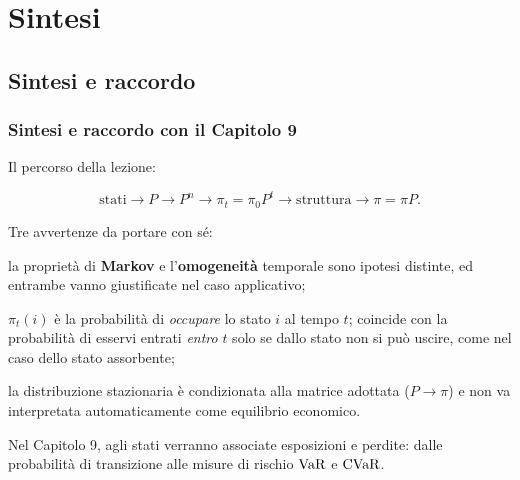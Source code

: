 

\section{Sintesi}

\subsection{Sintesi e raccordo}%

\begin{frame}%
%

\frametitle{Sintesi e raccordo con il Capitolo 9}%
%

%


Il percorso della lezione:%

\[
\text{stati} \longrightarrow P \longrightarrow P^{n} \longrightarrow\pi
_{t}=\pi_{0}P^{t} \longrightarrow\text{struttura} \longrightarrow\pi=\pi P.
\]


\medskip

Tre avvertenze da portare con s\'{e}:

\begin{stepitemize}
\item la propriet\`{a} di \textbf{Markov} e l'\textbf{omogeneit\`{a}}
temporale sono ipotesi distinte, ed entrambe vanno giustificate nel caso applicativo;

\item $\pi_{t}(i)$ \`{e} la probabilit\`{a} di \emph{occupare} lo stato $i$ al
tempo $t$; coincide con la probabilit\`a di esservi entrati \emph{entro} $t$
solo se dallo stato non si pu\`o uscire, come nel caso dello stato assorbente;

\item la distribuzione stazionaria \`{e} condizionata alla matrice adottata
($P\longrightarrow\pi$) e non va interpretata automaticamente come equilibrio economico.
\end{stepitemize}

\medskip

\begin{center}
{\small Nel Capitolo 9, agli stati verranno associate esposizioni e perdite:
dalle probabilit\`{a} di transizione alle misure di rischio $\operatorname{VaR}$ e $\operatorname{CVaR}$.}
\end{center}

%

\transboxout
\end{frame}%


